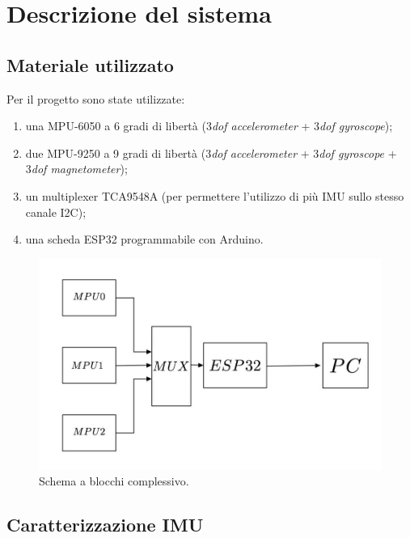 \section{Descrizione del sistema}\label{Descrizione del sistema}

\subsection{Materiale utilizzato}

Per il progetto sono state utilizzate:
\begin{enumerate}
    \item una MPU-6050 a 6 gradi di libertà (3\textit{dof accelerometer} + 3\textit{dof gyroscope});
    \item due MPU-9250 a 9 gradi di libertà (3\textit{dof accelerometer} + 3\textit{dof gyroscope} + 3\textit{dof magnetometer});
    \item un multiplexer TCA9548A (per permettere l'utilizzo di più IMU sullo stesso canale I2C);
    \item una scheda ESP32 programmabile con Arduino.
\end{enumerate}

\begin{figure}[H]
    \includegraphics[scale=0.35]{immagini/schema_blocchi.jpg}
    \centering
    \caption{Schema a blocchi complessivo.}
\end{figure}

\clearpage

\subsection{Caratterizzazione IMU}\label{Caratterizzazione IMU}

